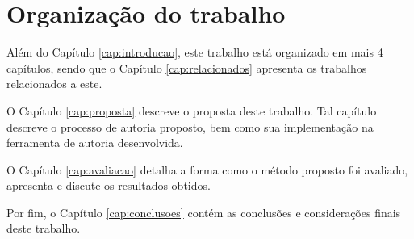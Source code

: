\documentclass[../main.tex]{subfiles}
\begin{document}
\section{Organização do trabalho}

Além do Capítulo \ref{cap:introducao}, este trabalho está organizado em mais 4 capítulos, sendo que o Capítulo \ref{cap:relacionados} apresenta os trabalhos relacionados a este.


O Capítulo \ref{cap:proposta} descreve o proposta deste trabalho. Tal capítulo descreve o processo de autoria proposto, bem como sua implementação na ferramenta de autoria desenvolvida.

O Capítulo \ref{cap:avaliacao} detalha a forma como o método proposto foi avaliado, apresenta e discute os resultados obtidos.

Por fim, o Capítulo \ref{cap:conclusoes} contém as conclusões e considerações finais deste trabalho.
\end{document}
